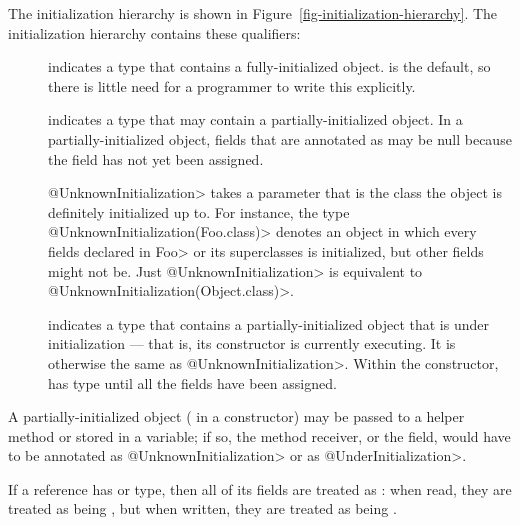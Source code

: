 The initialization hierarchy is shown in Figure~\ref{fig-initialization-hierarchy}.
The initialization hierarchy contains these qualifiers:

\begin{description}

\item[]
  indicates a type that contains a fully-initialized object.  
  is the default, so there is little need for a programmer to write this
  explicitly.

\item[]
  indicates a type that may contain a partially-initialized object.  In a
  partially-initialized object, fields that are annotated as
   may be null because the field
  has not yet been assigned.

  \<@UnknownInitialization> takes a parameter that is the class the object
  is definitely initialized up to.  For instance, the type
  \<@UnknownInitialization(Foo.class)> denotes an object in which every
  fields declared in \<Foo> or its superclasses is initialized, but other
  fields might not be.
  Just \<@UnknownInitialization> is equivalent to
  \<@UnknownInitialization(Object.class)>.

\item[]
  indicates a type that contains a partially-initialized object that is
  under initialization --- that is, its constructor is currently executing.
  It is otherwise the same as \<@UnknownInitialization>.  Within the
  constructor,  has
   type until
  all the  fields have been assigned.

\end{description}

  A partially-initialized object ( in a constructor) may be
  passed to a helper method or stored in a variable; if so, the method
  receiver, or the field, would have to be annotated as
  \<@UnknownInitialization> or as \<@UnderInitialization>.


If a reference has
 or  type, then all of its  fields are treated as
:  when read, they are
treated as being , but when
written, they are treated as being
.

